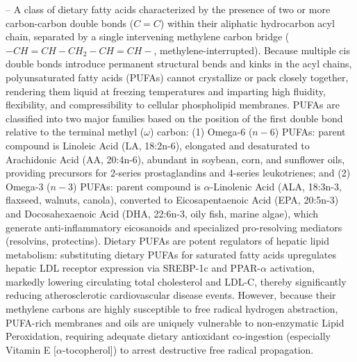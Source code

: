 -- A class of dietary fatty acids characterized by the presence of two or more carbon-carbon double bonds ($C=C$) within their aliphatic hydrocarbon acyl chain, separated by a single intervening methylene carbon bridge ($-CH=CH-CH_2-CH=CH-$, methylene-interrupted). Because multiple cis double bonds introduce permanent structural bends and kinks in the acyl chains, polyunsaturated fatty acids (PUFAs) cannot crystallize or pack closely together, rendering them liquid at freezing temperatures and imparting high fluidity, flexibility, and compressibility to cellular phospholipid membranes. PUFAs are classified into two major families based on the position of the first double bond relative to the terminal methyl ($\omega$) carbon: (1) Omega-6 ($n-6$) PUFAs: parent compound is Linoleic Acid (LA, 18:2n-6), elongated and desaturated to Arachidonic Acid (AA, 20:4n-6), abundant in soybean, corn, and sunflower oils, providing precursors for 2-series prostaglandins and 4-series leukotrienes; and (2) Omega-3 ($n-3$) PUFAs: parent compound is $\alpha$-Linolenic Acid (ALA, 18:3n-3, flaxseed, walnuts, canola), converted to Eicosapentaenoic Acid (EPA, 20:5n-3) and Docosahexaenoic Acid (DHA, 22:6n-3, oily fish, marine algae), which generate anti-inflammatory eicosanoids and specialized pro-resolving mediators (resolvins, protectins). Dietary PUFAs are potent regulators of hepatic lipid metabolism: substituting dietary PUFAs for saturated fatty acids upregulates hepatic LDL receptor expression via SREBP-1c and PPAR-$\alpha$ activation, markedly lowering circulating total cholesterol and LDL-C, thereby significantly reducing atherosclerotic cardiovascular disease events. However, because their methylene carbons are highly susceptible to free radical hydrogen abstraction, PUFA-rich membranes and oils are uniquely vulnerable to non-enzymatic Lipid Peroxidation, requiring adequate dietary antioxidant co-ingestion (especially Vitamin E [$\alpha$-tocopherol]) to arrest destructive free radical propagation.

